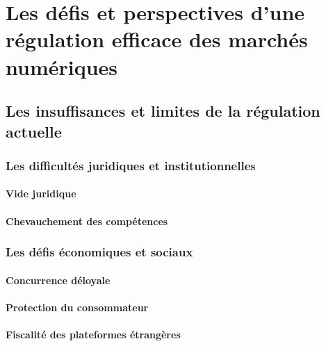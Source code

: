 
\part{Les défis et perspectives d'une régulation efficace des marchés numériques}

\chapter{Les insuffisances et limites de la régulation actuelle}

\section{Les difficultés juridiques et institutionnelles}

\subsection{Vide juridique}


\subsection{Chevauchement des compétences}


\section{Les défis économiques et sociaux}

\subsection{Concurrence déloyale}


\subsection{Protection du consommateur}


\subsection{Fiscalité des plateformes étrangères}

